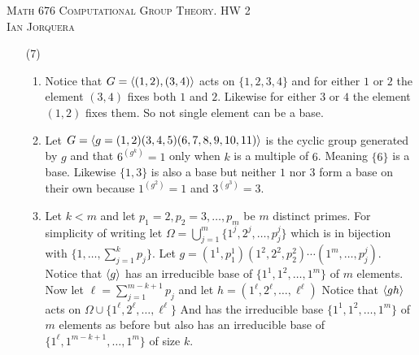\documentclass[12pt]{amsart}
\begin{document}
\begin{center}
   \textsc{Math 676 Computational Group Theory. HW 2\\ Ian Jorquera}
\end{center}
\vspace{1em}

\begin{itemize}
   \item[(7)] 
   \begin{enumerate}[label= (\alph*)]
      \item Notice that $G=\left\langle (1,2),(3,4) \right\rangle$ acts on $\{1,2,3,4\}$ and for either 
      $1$ or $2$ the element $(3,4)$ fixes both $1$ and $2$. Likewise for either 
      $3$ or $4$ the element $(1,2)$ fixes them. So not single element can be a base.

      \item Let $G=\left\langle g=(1,2)(3,4,5)(6,7,8,9,10,11) \right\rangle$ is the cyclic group generated 
      by $g$ and that $6^{(g^k)}=1$ only when $k$ is a multiple of $6$. Meaning 
      $\{6\}$ is a base. Likewise $\{1,3\}$ is also a base but neither $1$ nor $3$ 
      form a base on their own because $1^{(g^2)}=1$ and $3^{(g^3)}=3$.

      \item Let $k<m$ and let $p_1=2,p_2=3,\dots, p_m$ be $m$ distinct primes. For 
      simplicity of writing let $\Omega=\bigcup_{j=1}^m\{1^j,2^j,\dots,p_j^j\}$ 
      which is in bijection with $\{1,\dots, \sum_{j=1}^kp_j\}$. Let 
      $g=(1^1,p_1^1)(1^2,2^2,p_2^2)\cdots (1^m,\dots,p_j^j)$. Notice that $\left\langle g \right\rangle$ 
      has an irreducible base of $\{1^1,1^2,\dots, 1^m\}$ of $m$ elements. Now 
      let $\ell=\sum_{j=1}^{m-k+1}p_j$ and let $h=(1^\ell,2^\ell,\dots,\ell^\ell)$
      Notice that $\left\langle gh \right\rangle$ acts on $\Omega\cup\{1^\ell,2^\ell,\dots,\ell^\ell\}$
      And has the irreducible base $\{1^1,1^2,\dots, 1^m\}$ of $m$ elements as before
      but also has an irreducible base of $\{1^\ell,1^{m-k+1},\dots, 1^m\}$ of size $k$.



\end{enumerate}
\end{itemize}
\end{document}
